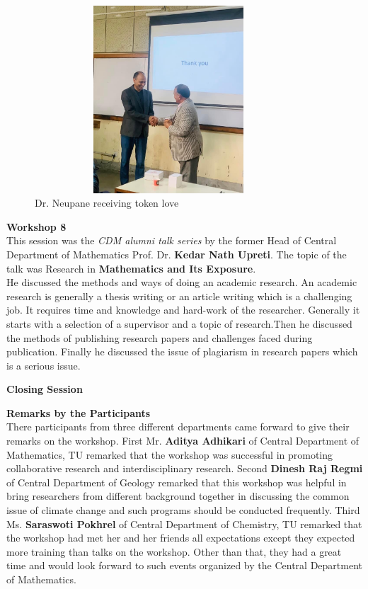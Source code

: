 \documentclass[a4paper,12pt]{report}
\begin{document}
\vspace{10mm}
\begin{figure}[h!]
  \centering
  \includegraphics[width=10cm, height=7cm]{neupane.jpeg}
  \caption{Dr. Neupane receiving token love}
\end{figure}

\vspace{23mm}

{\bfseries \large Workshop 8}\\[3mm]
This session was the \textit{CDM alumni talk series} by the former Head of Central Department of Mathematics Prof. Dr. \textbf{Kedar Nath Upreti}. The topic of the talk was Research in \textbf{Mathematics and Its Exposure}.\\[3mm]
He discussed the methods and ways of doing an academic research. An academic research is generally a thesis writing or an article writing which is a challenging job. It requires time and knowledge and hard-work of the researcher. Generally it starts with a selection of a supervisor and a topic of research.Then he discussed the methods of publishing research papers and challenges faced during publication. Finally he discussed the issue of plagiarism in research papers which is a serious issue.
\clearpage

\begin{center}
  {\bfseries \Large Closing Session}
\end{center}
\vspace{5mm}

{\bfseries \large Remarks by the Participants}\\[3mm]
There participants from three different departments came forward to give their remarks on the workshop. First Mr. \textbf{Aditya Adhikari} of Central Department of Mathematics, TU remarked that the workshop was successful in promoting collaborative research and interdisciplinary research. Second \textbf{Dinesh Raj Regmi} of Central Department of Geology remarked that this workshop was helpful in bring researchers from different background together in discussing the common issue of climate change and such programs should be conducted frequently. Third Ms. \textbf{Saraswoti Pokhrel} of Central Department of Chemistry, TU remarked that the workshop had met her and her friends all expectations except they expected more training than talks on the workshop. Other than that, they had a great time and would look forward to such events organized by the Central Department of Mathematics.\\[5mm]
\end{document}
